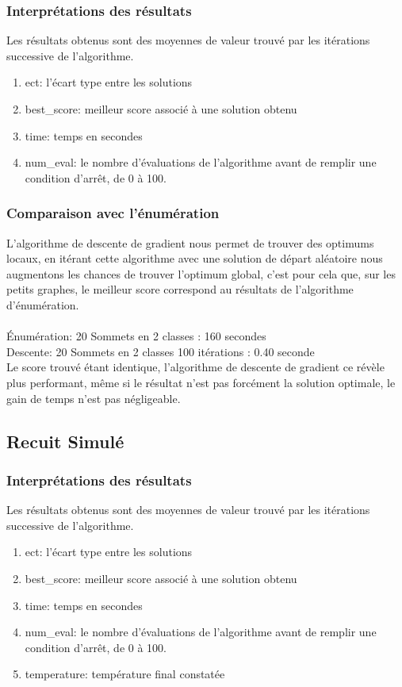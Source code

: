 \documentclass[a4paper]{article}
\begin{document}
		\subsubsection{Interprétations des résultats}
		Les résultats obtenus sont des moyennes de valeur trouvé par les itérations successive de l'algorithme.\\
		\begin{enumerate}
			\item{ect}: l'écart type entre les solutions
			\item{best\_score}: meilleur score associé à une solution obtenu
			\item{time}: temps en secondes
			\item{num\_eval}: le nombre d'évaluations de l'algorithme avant de remplir une condition d'arrêt, de 0 à 100.
		\end{enumerate}

		\subsubsection{Comparaison avec l'énumération}
		L'algorithme de descente de gradient nous permet de trouver des optimums locaux, en itérant cette algorithme avec une solution de départ aléatoire nous augmentons les chances de trouver l'optimum global, c'est pour cela que, sur les petits graphes, le meilleur score correspond au résultats de l'algorithme d'énumération.\\\\
		Énumération: 20 Sommets en 2 classes : 160 secondes\\
		Descente: 20 Sommets en 2 classes 100 itérations : 0.40 seconde\\

		Le score trouvé étant identique, l'algorithme de descente de gradient ce révèle plus performant, même si le résultat n'est pas forcément la solution optimale, le gain de temps n'est pas négligeable.\\

	\subsection{Recuit Simulé}
		\subsubsection{Interprétations des résultats}
			Les résultats obtenus sont des moyennes de valeur trouvé par les itérations successive de l'algorithme.\\
			\begin{enumerate}
				\item{ect}: l'écart type entre les solutions
				\item{best\_score}: meilleur score associé à une solution obtenu
				\item{time}: temps en secondes
				\item{num\_eval}: le nombre d'évaluations de l'algorithme avant de remplir une condition d'arrêt, de 0 à 100.
				\item{temperature}: température final constatée
			\end{enumerate}
\end{document}
